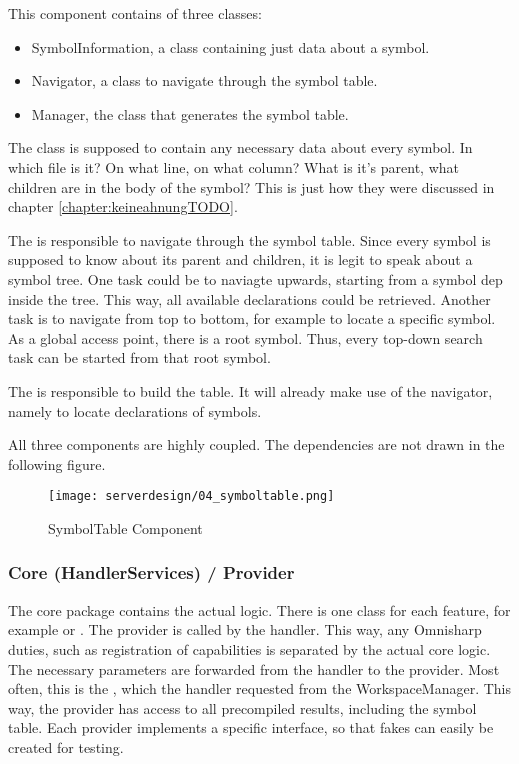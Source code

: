 This component contains of three classes:
\begin{itemize}
    \item SymbolInformation, a class containing just data about a symbol. 
    \item Navigator, a class to navigate through the symbol table.
    \item Manager, the class that generates the symbol table.
\end{itemize}

The  class is supposed to contain any necessary data about every symbol. In which file is it? On what line, on what column? What is it's parent, what children are in the body of the symbol? This is just how they were discussed in chapter \ref{chapter:keineahnungTODO}. 

The  is responsible to navigate through the symbol table. Since every symbol is supposed to know about its parent and children, it is legit to speak about a symbol tree. One task could be to naviagte upwards, starting from a symbol dep inside the tree. This way, all available declarations could be retrieved. Another task is to navigate from top to bottom, for example to locate a specific symbol. As a global access point, there is a root symbol. Thus, every top-down search task can be started from that root symbol.

The  is responsible to build the table. It will already make use of the navigator, namely to locate declarations of symbols.

All three components are highly coupled. The dependencies are not drawn in the following figure.


\begin{figure}[H]
    \centering
    \texttt{[image: serverdesign/04\_symboltable.png]}
    \caption{SymbolTable Component}
    \label{fig:server_st}
\end{figure}




\subsubsection {Core (HandlerServices) / Provider}
The core package contains the actual logic. There is one class for each feature, for example  or . The provider is called by the handler. This way, any Omnisharp duties, such as registration of capabilities is separated by the actual core logic. The necessary parameters are forwarded from the handler to the provider. Most often, this is the , which the handler requested from the WorkspaceManager. This way, the provider has access to all precompiled results, including the symbol table. Each provider implements a specific interface, so that fakes can easily be created for testing.


